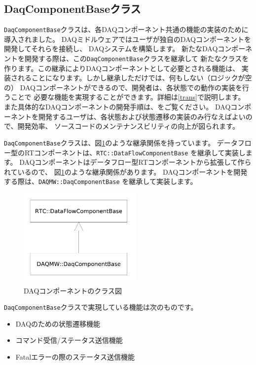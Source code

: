 \documentclass[a4j,10pt,dvips,onecolumn,oneside,final]{jarticle}%
\begin{document}
\subsection{DaqComponentBaseクラス}
\verb|DaqComponentBase|クラスは、各DAQコンポーネント共通の機能の実装のために導入されました。
DAQミドルウェアではユーザが独自のDAQコンポーネントを開発してそれらを接続し、
DAQシステムを構築します。
新たなDAQコンポーネントを開発する際は、この\verb|DaqComponentBase|クラスを継承して
新たなクラスを作ります。この継承によりDAQコンポーネントとして必要とされる機能は、
実装されることになります。しかし継承しただけでは、何もしない（ロジックが空の）
DAQコンポーネントができるので、開発者は、各状態での動作の実装を行うことで
必要な機能を実現することができます。詳細は\ref{trans}で説明します。
また具体的なDAQコンポーネントの開発手順は、\cite{COMP-DEV}をご覧ください。
DAQコンポーネントを開発するユーザは、各状態および状態遷移の実装のみ行なえばよいので、開発効率、
ソースコードのメンテナンスビリティの向上が図られます。

\verb|DaqComponentBase|クラスは、図\ref{class-diag.fig}のような継承関係を持っています。
データフロー型のRTコンポーネントは、\verb|RTC::DataFlowComponentBase| を継承して実装します。
DAQコンポーネントはデータフロー型RTコンポーネントから拡張して作られているので、
図\ref{class-diag.fig}のような継承関係があります。
DAQコンポーネントを開発する際は、\verb|DAQMW::DaqComponentBase| を継承して実装します。
\begin{figure}[htbp]
 \begin{center}
  \includegraphics[width=60mm]{class-diag.pdf}
  \caption{DAQコンポーネントのクラス図}
  \label{class-diag.fig}
 \end{center}
\end{figure}

\verb|DaqComponentBase|クラスで実現している機能は次のものです。
\begin{itemize}
\item DAQのための状態遷移機能
\item コマンド受信/ステータス送信機能
\item Fatalエラーの際のステータス送信機能
\end{itemize}
\end{document}
